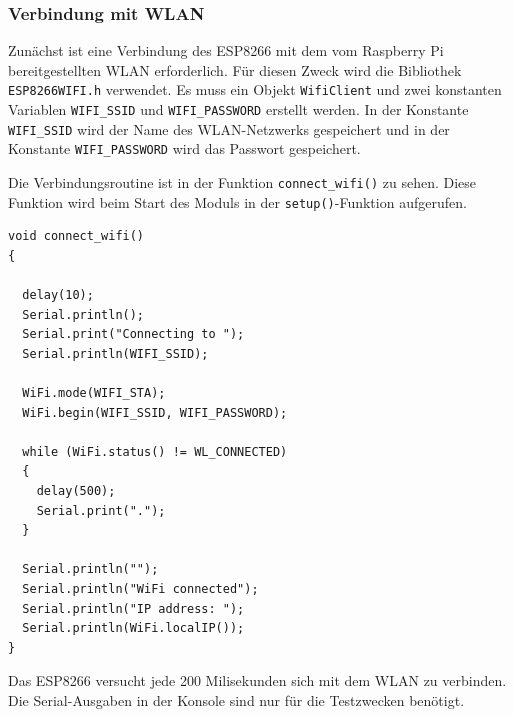 \documentclass[12pt, letterpaper]{article}
\begin{document}
\subsubsection{Verbindung mit WLAN}
\par Zunächst ist eine Verbindung des ESP8266 mit dem vom Raspberry Pi bereitgestellten WLAN erforderlich. Für diesen Zweck wird die Bibliothek \texttt{ESP8266WIFI.h} verwendet. Es muss ein Objekt \texttt{WifiClient} und zwei konstanten Variablen \texttt{WIFI\_SSID} und \texttt{WIFI\_PASSWORD} erstellt werden. In der Konstante \texttt{WIFI\_SSID} wird der Name des WLAN-Netzwerks gespeichert und in der Konstante \texttt{WIFI\_PASSWORD} wird das Passwort gespeichert.
\par Die Verbindungsroutine ist in der Funktion \texttt{connect\_wifi()}  zu sehen. Diese Funktion wird beim Start des Moduls in der \texttt{setup()}-Funktion aufgerufen.
\begin{lstlisting}[frame=single, style=cpp,caption={ESP8266: connect\_wifi()}]
  void connect_wifi()
{

  delay(10);
  Serial.println();
  Serial.print("Connecting to ");
  Serial.println(WIFI_SSID);

  WiFi.mode(WIFI_STA);
  WiFi.begin(WIFI_SSID, WIFI_PASSWORD);

  while (WiFi.status() != WL_CONNECTED)
  {
    delay(500);
    Serial.print(".");
  }

  Serial.println("");
  Serial.println("WiFi connected");
  Serial.println("IP address: ");
  Serial.println(WiFi.localIP());
}
\end{lstlisting}
\par Das ESP8266 versucht jede 200 Milisekunden sich mit dem WLAN zu verbinden. Die Serial-Ausgaben in der Konsole sind nur für die Testzwecken benötigt. 
\end{document}
